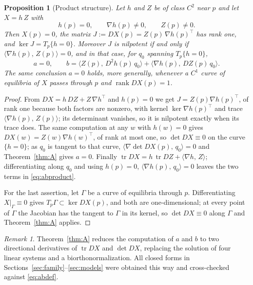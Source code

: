 \documentclass[12pt]{article}
\theoremstyle{plain}
\newtheorem{proposition}[theorem]{Proposition}
\theoremstyle{definition}
\theoremstyle{remark}
\newtheorem{remark}[theorem]{Remark}
\newcommand{\tr}{\operatorname{tr}}
\DeclareMathOperator{\dt}{det}
\DeclareMathOperator{\rank}{rank}
\newcommand{\ip}[2]{\langle #1,\, #2\rangle}
\begin{document}
	\begin{proposition}[Product structure]\label{prop:product}
		Let $h$ and $Z$ be of class $C^{2}$ near $p$ and let $X=h\,Z$ with
		\[
		h(p)=0,\qquad \nabla h(p)\neq0,\qquad Z(p)\neq0 .
		\]
		Then $X(p)=0$, the matrix $J:=DX(p)=Z(p)\,\nabla h(p)^{\top}$ has rank
		one, and $\ker J=T_{p}\{h=0\}$.  Moreover $J$ is nilpotent if and only
		if $\ip{\nabla h(p)}{Z(p)}=0$, and in that case, for $q_{0}$ spanning
		$T_{p}\{h=0\}$,
		\begin{equation}\label{eq:abproduct}
			a=0,
			\qquad
			b=\ip{Z(p)}{D^{2}h(p)\,q_{0}}
			+\ip{\nabla h(p)}{DZ(p)\,q_{0}} .
		\end{equation}
		The same conclusion $a=0$ holds, more generally, whenever a $C^{1}$
		curve of equilibria of $X$ passes through $p$ and $\rank DX(p)=1$.
	\end{proposition}
	
	\begin{proof}
		From $DX=h\,DZ+Z\,\nabla h^{\top}$ and $h(p)=0$ we get
		$J=Z(p)\nabla h(p)^{\top}$, of rank one because both factors are
		nonzero, with kernel $\ker\nabla h(p)^{\top}$ and trace
		$\ip{\nabla h(p)}{Z(p)}$; its determinant vanishes, so it is nilpotent
		exactly when its trace does.  The same computation at any $w$ with
		$h(w)=0$ gives $DX(w)=Z(w)\nabla h(w)^{\top}$, of rank at most one, so
		$\dt DX\equiv0$ on the curve $\{h=0\}$; as $q_{0}$ is tangent to that
		curve, $\ip{\nabla\!\dt DX(p)}{q_{0}}=0$ and Theorem~\ref{thm:A} gives
		$a=0$.  Finally $\tr DX=h\,\tr DZ+\ip{\nabla h}{Z}$; differentiating
		along $q_{0}$ and using $h(p)=0$, $\ip{\nabla h(p)}{q_{0}}=0$ leaves
		the two terms in \eqref{eq:abproduct}.
		
		For the last assertion, let $\Gamma$ be a curve of equilibria through
		$p$.  Differentiating $X|_{\Gamma}\equiv0$ gives
		$T_{p}\Gamma\subset\ker DX(p)$, and both are one-dimensional; at every
		point of $\Gamma$ the Jacobian has the tangent to $\Gamma$ in its
		kernel, so $\dt DX\equiv0$ along $\Gamma$ and Theorem~\ref{thm:A}
		applies.
	\end{proof}
	
	\begin{remark}\label{rem:computational}
		Theorem~\ref{thm:A} reduces the computation of $a$ and $b$ to two
		directional derivatives of $\tr DX$ and $\dt DX$, replacing the
		solution of four linear systems and a biorthonormalization.  All closed
		forms in Sections~\ref{sec:family}--\ref{sec:models} were obtained this
		way and cross-checked against \eqref{eq:abdef}.
	\end{remark}
	
\end{document}
